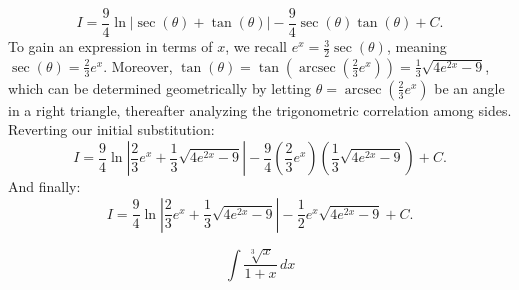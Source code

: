 \begin{questions}
\begin{solution}
    \[ I = \frac{9}{4}\ln|\sec(\theta)+\tan(\theta)| - \frac{9}{4}\sec(\theta)\tan(\theta) + C. \]
    To gain an expression in terms of $x$, we recall $e^{x}=\frac{3}{2}\sec(\theta)$, meaning $\sec(\theta)=\frac{2}{3}e^{x}$. Moreover, $\tan(\theta) = \tan(\operatorname{arcsec}(\frac{2}{3}e^{x})) = \frac{1}{3}\sqrt{4e^{2x}-9}$, which can be determined geometrically by letting $\theta=\operatorname{arcsec}(\frac{2}{3}e^{x})$ be an angle in a right triangle, thereafter analyzing the trigonometric correlation among sides. Reverting our initial substitution:
    \[ I = \frac{9}{4}\ln\left|\frac{2}{3}e^{x}+\frac{1}{3}\sqrt{4e^{2x}-9}\right| - \frac{9}{4}\left(\frac{2}{3}e^{x}\right)\left(\frac{1}{3}\sqrt{4e^{2x}-9}\right) + C. \]
    And finally:
    \[ I = \frac{9}{4}\ln\left|\frac{2}{3}e^{x}+\frac{1}{3}\sqrt{4e^{2x}-9}\right| - \frac{1}{2}e^{x}\sqrt{4e^{2x}-9} + C. \]
    \end{solution}

    \question
    \[ \int \frac{\sqrt[3]{x}}{1+x} \, dx \]


\end{questions}
